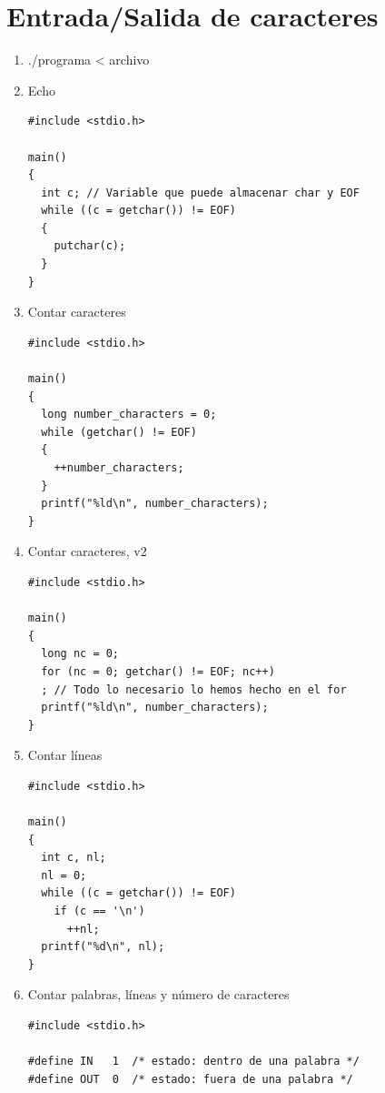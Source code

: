 \documentclass[a4paper,oneside]{article}
\begin{document}
\section{Entrada/Salida de caracteres}
  \begin{enumerate}
  \item ./programa < archivo
  \item Echo

    \begin{verbatim}
#include <stdio.h>

main()
{
  int c; // Variable que puede almacenar char y EOF
  while ((c = getchar()) != EOF)
  {
    putchar(c);
  }
}
    \end{verbatim}
  \item Contar caracteres

    \begin{verbatim}
#include <stdio.h>

main()
{
  long number_characters = 0;
  while (getchar() != EOF)
  {
    ++number_characters;
  }
  printf("%ld\n", number_characters);
}
    \end{verbatim}
  \item Contar caracteres, v2

    \begin{verbatim}
#include <stdio.h>

main()
{
  long nc = 0;
  for (nc = 0; getchar() != EOF; nc++)
  ; // Todo lo necesario lo hemos hecho en el for
  printf("%ld\n", number_characters);
}
    \end{verbatim}
  \item Contar líneas

    \begin{verbatim}
#include <stdio.h>

main()
{
  int c, nl;
  nl = 0;
  while ((c = getchar()) != EOF)
    if (c == '\n')
      ++nl;
  printf("%d\n", nl);
}
    \end{verbatim}
  \item Contar palabras, líneas y número de caracteres

    \begin{verbatim}
#include <stdio.h>

#define IN   1  /* estado: dentro de una palabra */
#define OUT  0  /* estado: fuera de una palabra */


\end{verbatim}
\end{enumerate}
\end{document}
